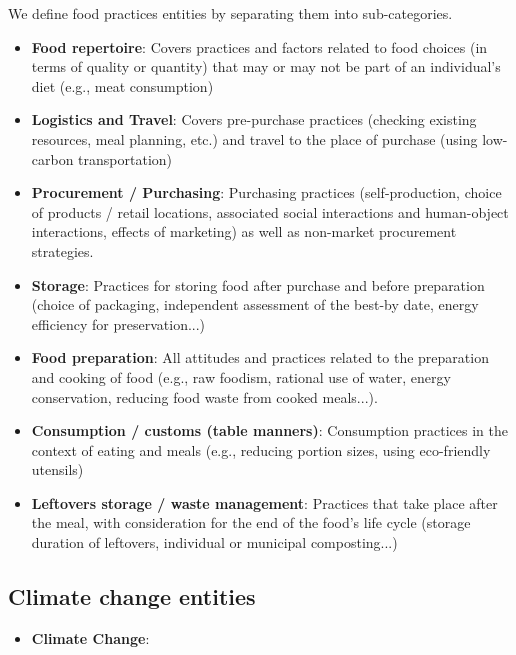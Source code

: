 \documentclass[11pt]{article}
\begin{document}
We define food practices entities by separating them into sub-categories. 

\begin{itemize}
    \item \textbf{Food repertoire}: Covers practices and factors related to food choices (in terms of quality or quantity) that may or may not be part of an individual's diet (e.g., meat consumption)

    \item \textbf{Logistics and Travel}: Covers pre-purchase practices (checking existing resources, meal planning, etc.) and travel to the place of purchase (using low-carbon transportation)

    \item \textbf{Procurement / Purchasing}: Purchasing practices (self-production, choice of products / retail locations, associated social interactions and human-object interactions, effects of marketing) as well as non-market procurement strategies.

    \item \textbf{Storage}: Practices for storing food after purchase and before preparation (choice of packaging, independent assessment of the best-by date, energy efficiency for preservation...)

    \item \textbf{Food preparation}: All attitudes and practices related to the preparation and cooking of food (e.g., raw foodism, rational use of water, energy conservation, reducing food waste from cooked meals...).

    \item \textbf{Consumption / customs (table manners)}: Consumption practices in the context of eating and meals (e.g., reducing portion sizes, using eco-friendly utensils)

    \item \textbf{Leftovers storage / waste management}: Practices that take place after the meal, with consideration for the end of the food's life cycle (storage duration of leftovers, individual or municipal composting...)
\end{itemize}

\subsection*{Climate change entities}

\begin{itemize}
    \item \textbf{Climate Change}:
\end{itemize}
\end{document}
